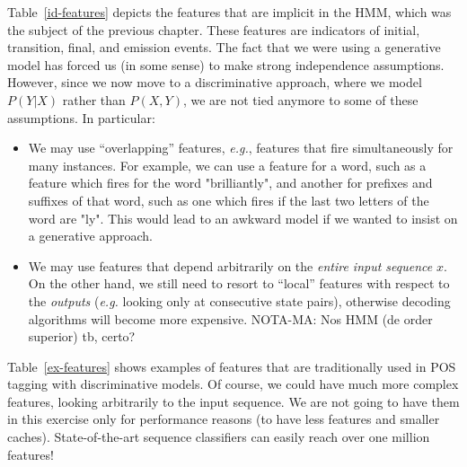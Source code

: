 Table~\ref{id-features} depicts the features that are implicit in the HMM, which was the subject of 
the previous chapter. These features are indicators of initial, transition, final, and emission events. 
The fact that we were using a generative model has forced us (in some sense) to 
make strong independence assumptions. 
However, since we now move to a discriminative approach, where we model $P(Y|X)$ rather than $P(X,Y)$, we are not tied anymore to 
some of these assumptions. In particular: 
\begin{itemize}
\item We may use ``overlapping'' features, \emph{e.g.}, features that fire simultaneously for many instances. 
For example, we can use a feature for a word, such as a feature which fires for the word "brilliantly", and another for prefixes and suffixes of that word, such as one which fires if the last two letters of the word are "ly".
This would lead to an awkward model if we wanted to insist on a generative approach. 
\item We may use features that depend arbitrarily on the \emph{entire input sequence} $x$. On the other hand, 
we still need to resort to ``local'' features with respect to the \emph{outputs} (\emph{e.g.} looking only at consecutive state pairs), 
otherwise decoding algorithms will become more expensive.  
NOTA-MA: Nos HMM (de order superior) tb, certo?
\end{itemize}
Table~\ref{ex-features} shows examples of features that are traditionally used in POS tagging with discriminative models.  
Of course, we could have much more complex features, looking arbitrarily to 
the input sequence. We are not going to have them in this
exercise only for performance reasons (to have less features and smaller caches). State-of-the-art sequence classifiers can easily reach over one million features!

